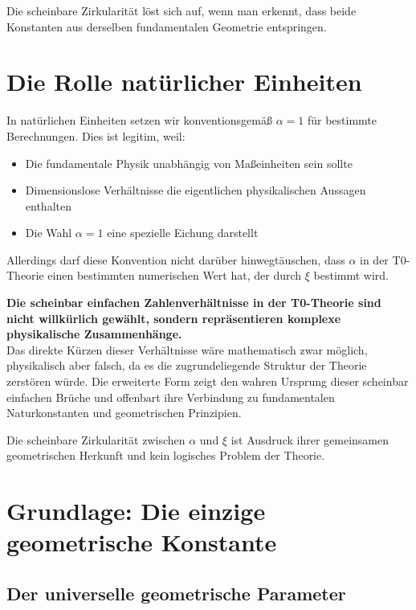 Die scheinbare Zirkularität löst sich auf, wenn man erkennt, dass beide Konstanten aus derselben fundamentalen Geometrie entspringen.

\section{Die Rolle natürlicher Einheiten}
\label{sec:einheiten}

In natürlichen Einheiten setzen wir konventionsgemäß $\alpha = 1$ für bestimmte Berechnungen. Dies ist legitim, weil:

\begin{itemize}
	\item Die fundamentale Physik unabhängig von Maßeinheiten sein sollte
	\item Dimensionslose Verhältnisse die eigentlichen physikalischen Aussagen enthalten
	\item Die Wahl $\alpha = 1$ eine spezielle Eichung darstellt
\end{itemize}

Allerdings darf diese Konvention nicht darüber hinwegtäuschen, dass $\alpha$ in der T0-Theorie einen bestimmten numerischen Wert hat, der durch $\xi$ bestimmt wird.

\begin{tcolorbox}[colback=blue!5!white,colframe=blue!75!black]
	\textbf{Die scheinbar einfachen Zahlenverhältnisse in der T0-Theorie sind nicht willkürlich gewählt, sondern repräsentieren komplexe physikalische Zusammenhänge.} \\
	
	Das direkte Kürzen dieser Verhältnisse wäre mathematisch zwar möglich, physikalisch aber falsch, da es die zugrundeliegende Struktur der Theorie zerstören würde. Die erweiterte Form zeigt den wahren Ursprung dieser scheinbar einfachen Brüche und offenbart ihre Verbindung zu fundamentalen Naturkonstanten und geometrischen Prinzipien.
	
	Die scheinbare Zirkularität zwischen $\alpha$ und $\xi$ ist Ausdruck ihrer gemeinsamen geometrischen Herkunft und kein logisches Problem der Theorie.
\end{tcolorbox}

	\section{Grundlage: Die einzige geometrische Konstante}
	
	\subsection{Der universelle geometrische Parameter}
	
